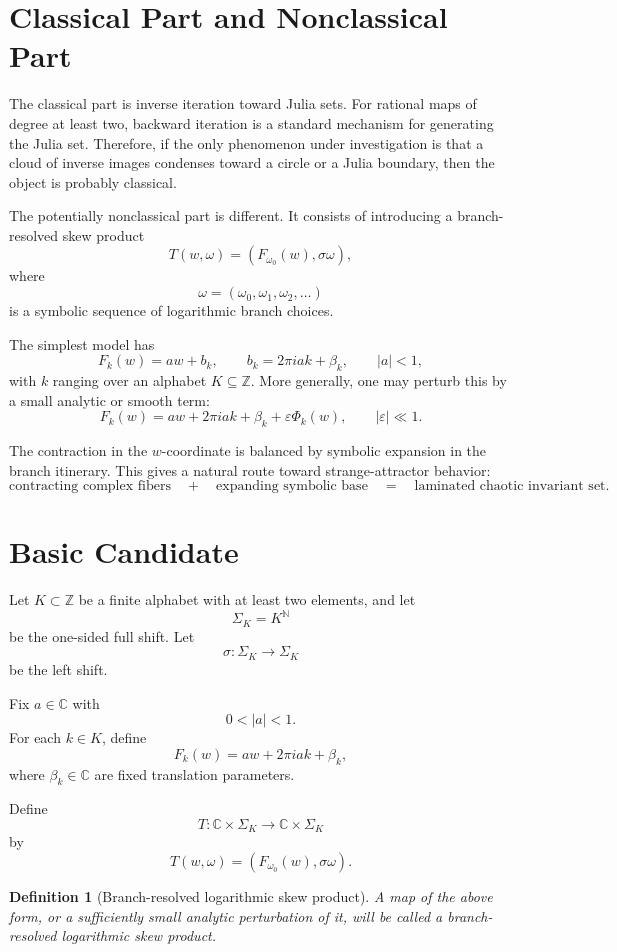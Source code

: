 \documentclass[12pt]{article}
\newtheorem{definition}{Definition}
\newcommand{\C}{\mathbb{C}}
\newcommand{\Z}{\mathbb{Z}}
\newcommand{\N}{\mathbb{N}}
\newcommand{\shift}{\sigma}
\begin{document}
	\section{Classical Part and Nonclassical Part}
	
	The classical part is inverse iteration toward Julia sets. For rational maps of degree at least two, backward iteration is a standard mechanism for generating the Julia set. Therefore, if the only phenomenon under investigation is that a cloud of inverse images condenses toward a circle or a Julia boundary, then the object is probably classical.
	
	The potentially nonclassical part is different. It consists of introducing a branch-resolved skew product
	\[
	T(w,\omega)
	=
	\left(
	F_{\omega_0}(w),
	\shift \omega
	\right),
	\]
	where
	\[
	\omega=(\omega_0,\omega_1,\omega_2,\dots)
	\]
	is a symbolic sequence of logarithmic branch choices.
	
	The simplest model has
	\[
	F_k(w)=a w + b_k,
	\qquad
	b_k = 2\pi i a k + \beta_k,
	\qquad |a|<1,
	\]
	with \(k\) ranging over an alphabet \(K\subseteq \Z\). More generally, one may perturb this by a small analytic or smooth term:
	\[
	F_k(w)=a w + 2\pi i a k + \beta_k + \varepsilon \Phi_k(w),
	\qquad |\varepsilon|\ll 1.
	\]
	
	The contraction in the \(w\)-coordinate is balanced by symbolic expansion in the branch itinerary. This gives a natural route toward strange-attractor behavior:
	\[
	\text{contracting complex fibers}
	\quad + \quad
	\text{expanding symbolic base}
	\quad = \quad
	\text{laminated chaotic invariant set}.
	\]
	
	\section{Basic Candidate}
	
	Let \(K\subset \Z\) be a finite alphabet with at least two elements, and let
	\[
	\Sigma_K=K^{\N}
	\]
	be the one-sided full shift. Let
	\[
	\shift:\Sigma_K\to\Sigma_K
	\]
	be the left shift.
	
	Fix \(a\in\C\) with
	\[
	0<|a|<1.
	\]
	For each \(k\in K\), define
	\[
	F_k(w)=a w + 2\pi i a k + \beta_k,
	\]
	where \(\beta_k\in\C\) are fixed translation parameters.
	
	Define
	\[
	T:\C\times \Sigma_K \to \C\times \Sigma_K
	\]
	by
	\[
	T(w,\omega)
	=
	\left(
	F_{\omega_0}(w),
	\shift\omega
	\right).
	\]
	
	\begin{definition}[Branch-resolved logarithmic skew product]
		A map of the above form, or a sufficiently small analytic perturbation of it, will be called a branch-resolved logarithmic skew product.
	\end{definition}
	
\end{document}
